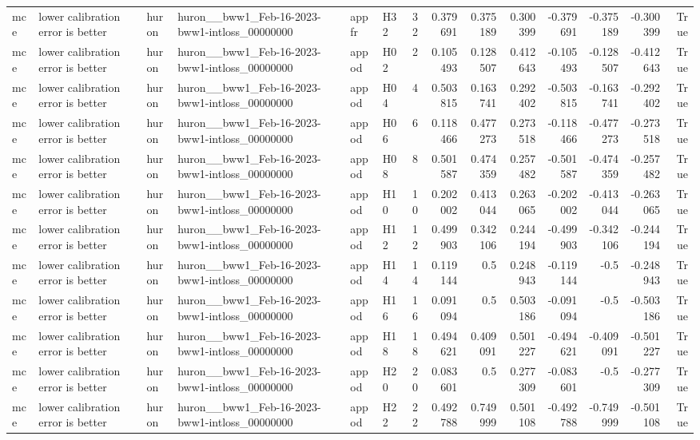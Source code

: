 \begin{longtable}{llllllrrrrrrrr}
mce & lower calibration error is better & huron & huron\_\_bww1\_Feb-16-2023-bww1-intloss\_00000000 & appfr & H32 & 32 & 0.379691 & 0.375189 & 0.300399 & -0.379691 & -0.375189 & -0.300399 & True \\
mce & lower calibration error is better & huron & huron\_\_bww1\_Feb-16-2023-bww1-intloss\_00000000 & appod & H02 & 2 & 0.105493 & 0.128507 & 0.412643 & -0.105493 & -0.128507 & -0.412643 & True \\
mce & lower calibration error is better & huron & huron\_\_bww1\_Feb-16-2023-bww1-intloss\_00000000 & appod & H04 & 4 & 0.503815 & 0.163741 & 0.292402 & -0.503815 & -0.163741 & -0.292402 & True \\
mce & lower calibration error is better & huron & huron\_\_bww1\_Feb-16-2023-bww1-intloss\_00000000 & appod & H06 & 6 & 0.118466 & 0.477273 & 0.273518 & -0.118466 & -0.477273 & -0.273518 & True \\
mce & lower calibration error is better & huron & huron\_\_bww1\_Feb-16-2023-bww1-intloss\_00000000 & appod & H08 & 8 & 0.501587 & 0.474359 & 0.257482 & -0.501587 & -0.474359 & -0.257482 & True \\
mce & lower calibration error is better & huron & huron\_\_bww1\_Feb-16-2023-bww1-intloss\_00000000 & appod & H10 & 10 & 0.202002 & 0.413044 & 0.263065 & -0.202002 & -0.413044 & -0.263065 & True \\
mce & lower calibration error is better & huron & huron\_\_bww1\_Feb-16-2023-bww1-intloss\_00000000 & appod & H12 & 12 & 0.499903 & 0.342106 & 0.244194 & -0.499903 & -0.342106 & -0.244194 & True \\
mce & lower calibration error is better & huron & huron\_\_bww1\_Feb-16-2023-bww1-intloss\_00000000 & appod & H14 & 14 & 0.119144 & 0.5 & 0.248943 & -0.119144 & -0.5 & -0.248943 & True \\
mce & lower calibration error is better & huron & huron\_\_bww1\_Feb-16-2023-bww1-intloss\_00000000 & appod & H16 & 16 & 0.091094 & 0.5 & 0.503186 & -0.091094 & -0.5 & -0.503186 & True \\
mce & lower calibration error is better & huron & huron\_\_bww1\_Feb-16-2023-bww1-intloss\_00000000 & appod & H18 & 18 & 0.494621 & 0.409091 & 0.501227 & -0.494621 & -0.409091 & -0.501227 & True \\
mce & lower calibration error is better & huron & huron\_\_bww1\_Feb-16-2023-bww1-intloss\_00000000 & appod & H20 & 20 & 0.083601 & 0.5 & 0.277309 & -0.083601 & -0.5 & -0.277309 & True \\
mce & lower calibration error is better & huron & huron\_\_bww1\_Feb-16-2023-bww1-intloss\_00000000 & appod & H22 & 22 & 0.492788 & 0.749999 & 0.501108 & -0.492788 & -0.749999 & -0.501108 & True \\

\end{longtable}

